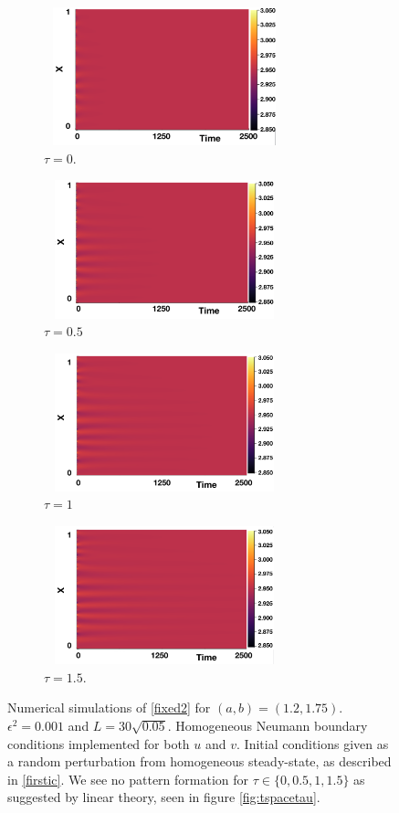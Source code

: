 \begin{figure}[H]
    \centering
    \begin{subfigure}[b]{0.45\textwidth}
        \centering
        \includegraphics[width=7cm,height=4cm]{p3t0.png}
        \caption{$\tau=0$.}
        \label{}
    \end{subfigure}
    \hfill
    \begin{subfigure}[b]{0.45\textwidth}
        \centering
        \includegraphics[width=7cm,height=4cm]{p3t05.png}
        \caption{$\tau=0.5$}
        \label{}
    \end{subfigure}
    \hfill
    \begin{subfigure}[b]{0.45\textwidth}
        \centering
        \includegraphics[width=7cm,height=4cm]{p3t1.png}
        \caption{$\tau=1$}
        \label{}
    \end{subfigure}
    \hfill
    \begin{subfigure}[b]{0.45\textwidth}
        \centering
        \includegraphics[width=7cm,height=4cm]{p3t15.png}
        \caption{$\tau=1.5$.}
        \label{}
    \end{subfigure}
    \caption{Numerical simulations of \eqref{fixed2} for $(a,b)=(1.2,1.75)$. $\epsilon^2=0.001$ and $L=30\sqrt{0.05}$. Homogeneous Neumann boundary conditions implemented for both $u$ and $v$. Initial conditions given as a random perturbation from homogeneous steady-state, as described in \eqref{firstic}. We see no pattern formation for $\tau\in\{0,0.5,1,1.5\}$ as suggested by linear theory, seen in figure \ref{fig:tspacetau}.}
    \label{fig:testturing2}
\end{figure}

